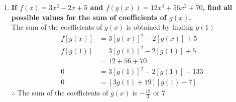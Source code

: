 \documentclass[12pt]{article}
\begin{document}
\begin{enumerate}
    \item \textbf{If $f(x)=3x^2-2x+5$ and $f(g(x))=12x^4+56x^2+70$, find all possible values for the sum of coefficients of $g(x)$.} \\
    
    The sum of the coefficients of $g(x)$ is obtained by finding $g(1)$
    \begin{align*}
        f[g(x)] &= 3[g(x)]^2 - 2[g(x)] + 5 \\
        f[g(1)] &= 3[g(1)]^2 - 2[g(1)] + 5 \\
        &= 12 + 56 + 70 \\
        0 &=3[g(1)]^2 - 2[g(1)] - 133 \\
        0 &= [3g(1) + 19][g(1) - 7]
    \end{align*}
    $\therefore$ The sum of the coefficients of $g(x)$ is $-\frac{19}{3}$ or $7$
\end{enumerate}
\end{document}
